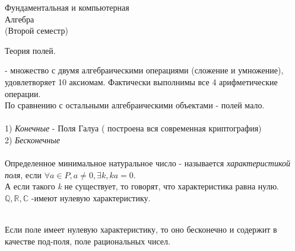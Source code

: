 \begin{title}
  Фундаментальная и компьютерная \\
  Алгебра\\
  (Второй семестр)
\end{title}

\begin{title}
  Теория полей.
\end{title}

 - множество с двумя алгебраическими операциями (сложение и умножение),
удовлетворяет 10 аксиомам. Фактически выполнимы все 4 арифметические операции.\\

По сравнению с остальными алгебраическими объектами - полей мало. \\

\\
1) {\emph {Конечные}} - Поля Галуа ( построена вся современная криптография)\\
2) {\emph {Бесконечные}} \\

\\
Определенное минимальное натуральное число  - называется {\emph
{характеристикой поля}}, если $\forall \mathit{a} \in \mathit {P,a} \neq 0,
\exists \mathit {k}, \mathit{ka} = 0 $. \\
А если такого {\emph {k}} не существует, то говорят, что характеристика равна
нулю.\\

$\mathbb{Q, R, C}$ -имеют нулевую характеристику.\\

 \\

\begin{theorem}
  Если поле имеет нулевую характеристику, то оно бесконечно и содержит в
  качестве под-поля, поле рациональных чисел.
\end{theorem}


